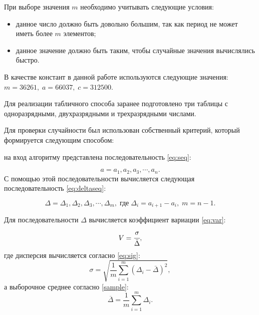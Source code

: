 При выборе значения $m$ необходимо учитывать следующие условия:
\begin{itemize}
    \item данное число должно быть довольно большим, так как период не
     может иметь более $m$ элементов;
    \item данное значение должно быть таким, чтобы случайные значения вычислялись быстро.
\end{itemize}
В качестве констант в данной работе используются следующие значения: $m = 36261,\;a = 66037,\;c = 312500$.

Для реализации табличного способа заранее подготовлено три таблицы с одноразрядными, двухразрядными и трехразрядными числами.

Для проверки случайности был использован собственный критерий, который формируется следующим 
способом:

 на вход алгоритму представлена последовательность \eqref{eq:seq}:

\begin{equation}
    a = a_1, a_2, a_3, \cdots, a_n.
\end{equation}\label{eq:seq}
С помощью этой последовательности вычисляется следующая последовательность \ref{eq:deltaseq}:

\begin{equation}\label{eq:deltaseq}
    \Delta = \Delta_1, \Delta_2, \Delta_3, \cdots, \Delta_m,\; \text{где}\; \Delta_i = a_{i + 1} - a_{i},\;m=n-1.
\end{equation}

Для последовательности $\Delta$ вычисляется коэффициент вариации \ref{eq:var}:
\begin{equation}\label{eq:var}
    V = \cfrac{\sigma}{\bar{\Delta}},
\end{equation}
где дисперсия вычисляется согласно \ref{eq:sig}:
\begin{equation}\label{eq:sig}
        \sigma=\sqrt{\frac{1}{m}\sum_{i=1}^m\left(\Delta_i-\bar{\Delta}\right)^2},
\end{equation}
а выборочное среднее согласно \ref{sample}:
\begin{equation}\label{sample}
    \displaystyle {\overline {\Delta}}={\frac {1}{m}}\sum \limits _{i=1}^{m}\Delta_{i}.
\end{equation}